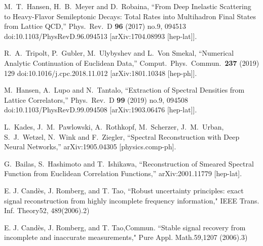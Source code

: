 \documentclass[a4paper,11pt]{article}
\begin{document}
\begin{thebibliography}{99}
  M.~T.~Hansen, H.~B.~Meyer and D.~Robaina,
  ``From Deep Inelastic Scattering to Heavy-Flavor Semileptonic Decays: Total Rates into Multihadron Final States from Lattice QCD,''
  Phys.\ Rev.\ D {\bf 96} (2017) no.9,  094513
  doi:10.1103/PhysRevD.96.094513
  [arXiv:1704.08993 [hep-lat]].

  R.~A.~Tripolt, P.~Gubler, M.~Ulybyshev and L.~Von Smekal,
  ``Numerical Analytic Continuation of Euclidean Data,''
  Comput.\ Phys.\ Commun.\  {\bf 237} (2019) 129
  doi:10.1016/j.cpc.2018.11.012
  [arXiv:1801.10348 [hep-ph]].

  M.~Hansen, A.~Lupo and N.~Tantalo,
  ``Extraction of Spectral Densities from Lattice Correlators,''
  Phys.\ Rev.\ D {\bf 99} (2019) no.9,  094508
  doi:10.1103/PhysRevD.99.094508
  [arXiv:1903.06476 [hep-lat]].

  L.~Kades, J.~M.~Pawlowski, A.~Rothkopf, M.~Scherzer, J.~M.~Urban, S.~J.~Wetzel, N.~Wink and F.~Ziegler,
  ``Spectral Reconstruction with Deep Neural Networks,''
  arXiv:1905.04305 [physics.comp-ph].

  G.~Bailas, S.~Hashimoto and T.~Ishikawa,
  ``Reconstruction of Smeared Spectral Function from Euclidean Correlation Functions,''
  arXiv:2001.11779 [hep-lat].





  
  E. J. Cand\`{e}s, J. Romberg, and T. Tao,
  ``Robust uncertainty principles: exact signal reconstruction from highly incomplete frequency information,"
  IEEE Trans. Inf. Theory52, 489(2006).2)  
  
  E. J. Cand\`{e}s, J. Romberg, and T. Tao,Commun. 
  ``Stable signal recovery from incomplete and inaccurate measurements,"
  Pure Appl. Math.59,1207 (2006).3)  
  

\end{thebibliography}
\end{document}
